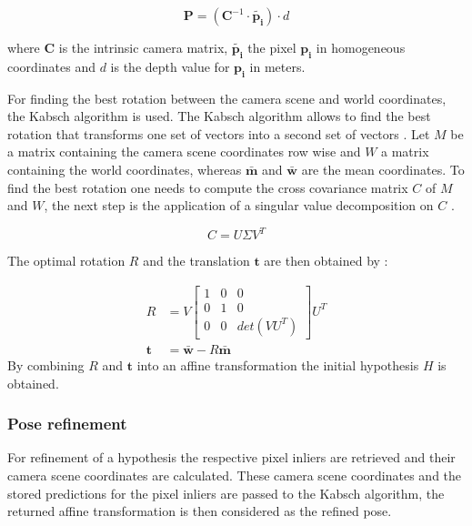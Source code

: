 \documentclass[final]{cvpr}
\begin{document}
\begin{equation}
	\boldsymbol{P} = (\boldsymbol{C}^{-1} \cdot \boldsymbol{\tilde{p_{i}}} ) \cdot d
\end{equation}

where $\boldsymbol{C}$ is the intrinsic camera matrix, $\boldsymbol{\tilde{p_{i}}}$ the pixel $\boldsymbol{p_{i}}$ in
homogeneous coordinates and $d$ is the depth value for $\boldsymbol{p_{i}}$ in meters. 

For finding the best
rotation between the camera scene and world coordinates, the Kabsch algorithm is used. The Kabsch algorithm allows to find the best rotation that transforms one set of vectors into a second set of vectors \cite{Kabsch1976}.
Let $M$ be a matrix containing the camera scene coordinates row wise and $W$ a matrix containing
the world coordinates, whereas $\boldsymbol{\bar{m}}$ and $\boldsymbol{\bar{w}}$ are the mean coordinates.
To find the best rotation one needs to compute the cross covariance matrix $C$ of $M$ and $W$, the 
next step is the application of a singular value decomposition on $C$ \cite{Brachmann2020}.

\begin{equation}
	C = U \Sigma V^T
\end{equation}

The optimal rotation $R$ and the translation $\boldsymbol{t}$ are then obtained by \cite{Brachmann2020}:

\begin{equation}
	\begin{split}
		R &= V 
		\begin{bmatrix}
			1 & 0 & 0\\
			0 & 1 & 0\\
			0 & 0 & det(VU^T)
		\end{bmatrix}
		U^T \\
		\boldsymbol{t} &= \boldsymbol{\bar{w}} - R \boldsymbol{\bar{m}}
	\end{split}
\end{equation}
 By combining $R$ and $\boldsymbol{t}$ into an affine transformation the initial hypothesis $H$ is obtained.
 
\subsubsection{Pose refinement}
For refinement of a hypothesis the respective pixel inliers are retrieved and their camera scene 
coordinates are calculated. These camera scene coordinates and the stored predictions for the pixel inliers 
are passed to the Kabsch algorithm, the returned affine transformation is then considered as the refined pose.
\end{document}
